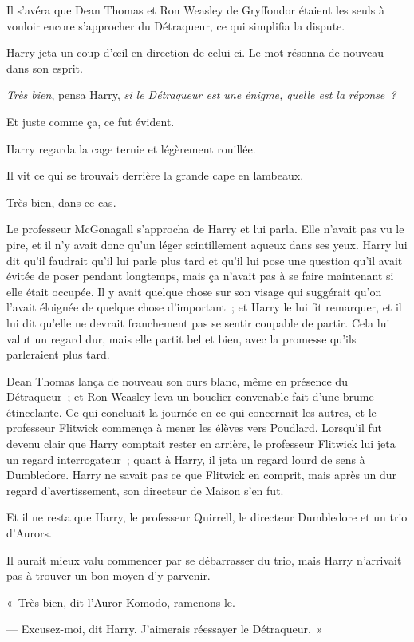 Il s'avéra que Dean Thomas et Ron Weasley de Gryffondor étaient les seuls à vouloir encore s'approcher du Détraqueur, ce qui simplifia la dispute.

Harry jeta un coup d'œil en direction de celui-ci. Le mot résonna de nouveau dans son esprit.

\emph{Très bien}, pensa Harry, \emph{si le Détraqueur est une énigme, quelle est la réponse~?}

Et juste comme ça, ce fut évident.

Harry regarda la cage ternie et légèrement rouillée.

Il vit ce qui se trouvait derrière la grande cape en lambeaux.

Très bien, dans ce cas.

Le professeur McGonagall s'approcha de Harry et lui parla. Elle n'avait pas vu le pire, et il n'y avait donc qu'un léger scintillement aqueux dans ses yeux. Harry lui dit qu'il faudrait qu'il lui parle plus tard et qu'il lui pose une question qu'il avait évitée de poser pendant longtemps, mais ça n'avait pas à se faire maintenant si elle était occupée. Il y avait quelque chose sur son visage qui suggérait qu'on l'avait éloignée de quelque chose d'important~; et Harry le lui fit remarquer, et il lui dit qu'elle ne devrait franchement pas se sentir coupable de partir. Cela lui valut un regard dur, mais elle partit bel et bien, avec la promesse qu'ils parleraient plus tard.

Dean Thomas lança de nouveau son ours blanc, même en présence du Détraqueur~; et Ron Weasley leva un bouclier convenable fait d'une brume étincelante. Ce qui concluait la journée en ce qui concernait les autres, et le professeur Flitwick commença à mener les élèves vers Poudlard. Lorsqu'il fut devenu clair que Harry comptait rester en arrière, le professeur Flitwick lui jeta un regard interrogateur~; quant à Harry, il jeta un regard lourd de sens à Dumbledore. Harry ne savait pas ce que Flitwick en comprit, mais après un dur regard d'avertissement, son directeur de Maison s'en fut.

Et il ne resta que Harry, le professeur Quirrell, le directeur Dumbledore et un trio d'Aurors.

Il aurait mieux valu commencer par se débarrasser du trio, mais Harry n'arrivait pas à trouver un bon moyen d'y parvenir.

«~Très bien, dit l'Auror Komodo, ramenons-le.

--- Excusez-moi, dit Harry. J'aimerais réessayer le Détraqueur.~»

